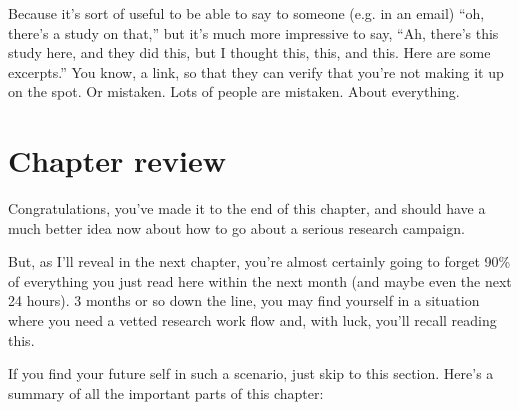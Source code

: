 Because it's sort of useful to be able to say to someone (e.g. in an email)
``oh, there's a study on that,'' but it's much more impressive to say, ``Ah,
there's this study here, and they did this, but I thought this, this, and
this. Here are some excerpts.'' You know, a link, so that they can verify that you're not making it up
on the spot. Or mistaken. Lots of people are mistaken. About everything.


\section{Chapter review}

Congratulations, you've made it to the end of this chapter, and should
have a much better idea now about how to go about a serious research campaign.

But, as I'll reveal in the next chapter, you're almost certainly going to forget
90\% of everything you just read here within the next month (and maybe even the next 24 hours). 3 months or so down
the line, you may find yourself in a situation where you need a vetted research
work flow and, with luck, you'll recall reading this.

If you find your future self in such a scenario, just skip to this
section. Here's a summary of all the important parts of this chapter:

